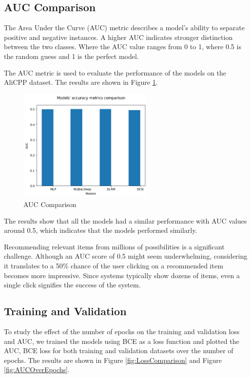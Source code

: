 \subsection{AUC Comparison}

The Area Under the Curve (AUC) metric describes a model's ability to separate positive and negative instances. A higher AUC indicates stronger distinction between the two classes. Where the AUC value ranges from 0 to 1, where 0.5 is the random guess and 1 is the perfect model.

The AUC metric is used to evaluate the performance of the models on the AliCPP dataset. The results are shown in Figure \ref{fig:AUCComparison}.

\begin{figure}[H]
    \centering
    \includegraphics[width=0.6\textwidth]{assets/models_comparasion.png}
    \caption[AUC Comparison]{AUC Comparison}
    \label{fig:AUCComparison}
\end{figure}

The results show that all the models had a similar performance with AUC values around 0.5, which indicates that the models performed similarly.

Recommending relevant items from millions of possibilities is a significant challenge. 
Although an AUC score of 0.5 might seem underwhelming, 
considering it translates to a 50\% chance of the user clicking on a recommended item becomes more impressive. 
Since systems typically show dozens of items, even a single click signifies the success of the system.

\subsection{Training and Validation}

To study the effect of the number of epochs on the training and validation loss and AUC, we trained the models using BCE as a loss function and plotted the AUC, BCE loss for both training and validation datasets over the number of epochs.
The results are shown in Figure \ref{fig:LossComparison} and Figure \ref{fig:AUCOverEpochs}.



